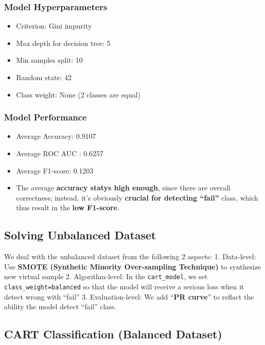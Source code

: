 \documentclass[11pt]{article}
\providecommand{\tightlist}{%
      \setlength{\itemsep}{0pt}\setlength{\parskip}{0pt}}
\begin{document}
    \subsubsection{Model Hyperparameters}\label{model-hyperparameters}

\begin{itemize}
\tightlist
\item
  Criterion: Gini impurity
\item
  Max depth for decision tree: 5
\item
  Min samples split: 10
\item
  Random state: 42
\item
  Class weight: None (2 classes are equal)
\end{itemize}

\subsubsection{Model Performance}\label{model-performance}

\begin{itemize}
\tightlist
\item
  Average Accuracy: 0.9107
\item
  Average ROC AUC : 0.6257
\item
  Average F1-score: 0.1203
\item
  The average \textbf{accuracy statys high enough}, since there are
  overall correctness; instead, it's obviously \textbf{crucial for
  detecting ``fail''} class, which thus result in the \textbf{low
  F1-score}.
\end{itemize}

    \subsection{Solving Unbalanced
Dataset}\label{solving-unbalanced-dataset}

    We deal with the unbalanced dataset from the following 2 aspects: 1.
Data-level: Use \textbf{SMOTE (Synthetic Minority Over-sampling
Technique)} to synthesize new virtual sample 2. Algorithm-level: In the
\texttt{cart\_model}, we set
\texttt{class\_weight=\textquotesingle{}balanced\textquotesingle{}} so
that the model will receive a serious loss when it detect wrong with
``fail'' 3. Evaluation-level: We add ``\textbf{PR curve}'' to reflact
the ability the model detect ``fail'' class.

    \subsection{CART Classification (Balanced
Dataset)}\label{cart-classification-balanced-dataset}
\end{document}
